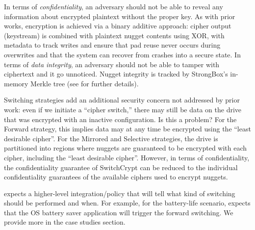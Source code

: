 

In terms of {\em confidentiality}, an adversary should not be able to reveal
any information about encrypted plaintext without the proper key.  As with
prior works, encryption is achieved via a binary additive approach: cipher
output (keystream) is combined with plaintext nugget contents using XOR,
with metadata to track writes and ensure that pad reuse never occurs
during overwrites and that the system can recover from crashes into a
secure state.
In terms of {\em data integrity}, an adversary should not be able to
tamper with ciphertext and it go unnoticed. Nugget integrity is tracked by
StrongBox's in-memory Merkle tree (see \cite[Section \xxx]{StrongBox} for
further details).

Switching strategies add an additional security concern not addressed by
prior work: even if we initiate a ``cipher switch,'' there may still be
data on the drive that was encrypted with an inactive configuration. Is
this a problem? For the Forward strategy, this implies data may at any
time be encrypted using the ``least desirable cipher''. For the Mirrored
and Selective strategies, the drive is partitioned into regions where
nuggets are guaranteed to be encrypted with each cipher, including the
``least desirable cipher''. However, in terms of confidentiality, the
confidentiality guarantee of SwitchCrypt can be reduced to the individual
confidentiality guarantees of the available ciphers used to encrypt
nuggets. 



\sys expects a higher-level integration/policy that will tell \sys what kind of
switching should be performed and when.  For example, for the battery-life scenario,
\sys expects that the OS battery saver application will trigger the forward switching.
We provide more in the case studies section.



%

